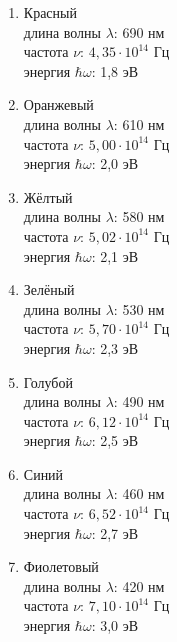\documentclass[14pt,a4paper]{article}
\begin{document}
    \par 
        \begin{enumerate}
            \item \textcolor[rgb]{1, 0, 0}{Красный}\\
            длина волны {$\lambda$}: 690 нм\\
            частота {$\nu$}: {$4,35 \cdot 10^{14}$} Гц\\
            энергия {$\hbar \omega$}: 1,8 эВ
            \item \textcolor[rgb]{1, 0.65, 0}{Оранжевый}\\
            длина волны {$\lambda$}: 610 нм\\
            частота {$\nu$}: {$5,00 \cdot 10^{14}$} Гц\\
            энергия {$\hbar \omega$}: 2,0 эВ
            \item \textcolor[rgb]{1, 1, 0}{Жёлтый}\\
            длина волны {$\lambda$}: 580 нм\\
            частота {$\nu$}: {$5,02 \cdot 10^{14}$} Гц\\
            энергия {$\hbar \omega$}: 2,1 эВ
            \item \textcolor[rgb]{0, 1, 0}{Зелёный}\\
            длина волны {$\lambda$}: 530 нм\\
            частота {$\nu$}: {$5,70 \cdot 10^{14}$} Гц\\
            энергия {$\hbar \omega$}: 2,3 эВ
            \item \textcolor[rgb]{0, 0.75, 1}{Голубой}\\
            длина волны {$\lambda$}: 490 нм\\
            частота {$\nu$}: {$6,12 \cdot 10^{14}$} Гц\\
            энергия {$\hbar \omega$}: 2,5 эВ
            \item \textcolor[rgb]{0, 0, 1}{Синий}\\
            длина волны {$\lambda$}: 460 нм\\
            частота {$\nu$}: {$6,52 \cdot 10^{14}$} Гц\\
            энергия {$\hbar \omega$}: 2,7 эВ
            \item \textcolor[rgb]{0.6, 0, 1}{Фиолетовый}\\
            длина волны {$\lambda$}: 420 нм\\
            частота {$\nu$}: {$7,10 \cdot 10^{14}$} Гц\\
            энергия {$\hbar \omega$}: 3,0 эВ
        \end{enumerate}
\end{document}
